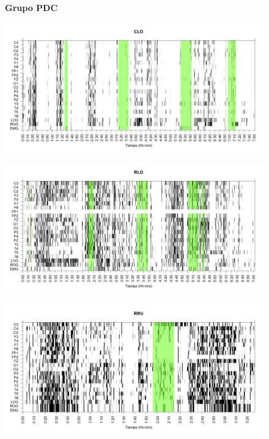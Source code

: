 \documentclass[12pt,a4paper]{mitthesis}
\begin{document}

\begin{figure}
\Large{\textbf{Grupo PDC}}
\end{figure}

\begin{figure}
\centering
\includegraphics[width=0.8\linewidth]
{./img_ejemplos/CLMN10SUE_est.png} 
\label{grf_CLO}
\end{figure}

\begin{figure}
\centering
\includegraphics[width=0.8\linewidth]
{./img_ejemplos/RLMN10SUE_est.png} 
\label{grf_RLO}
\end{figure}

\begin{figure}
\centering
\includegraphics[width=0.8\linewidth]
{./img_ejemplos/RRMNS_est.png} 
\label{grf_RRU}
\end{figure}
\end{document}
